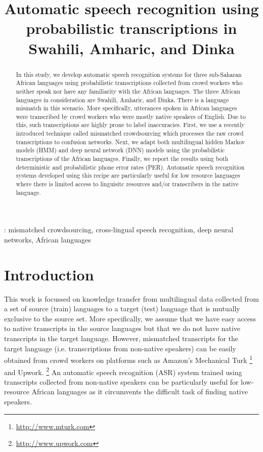 \documentclass[a4paper]{article}
\title{Automatic speech recognition using probabilistic transcriptions in Swahili, Amharic, and Dinka}
\newcommand{\myvspacesec}{\vspace{-2mm}}
\begin{document}
\maketitle
\begin{abstract}
In this study, we develop automatic speech recognition systems for three sub-Saharan African languages
using probabilistic transcriptions collected from crowd workers who neither speak nor have any familiarity
with the African languages. The three African languages in consideration are Swahili, Amharic, and Dinka. There is a language mismatch in this scenario. More specifically, utterances spoken in African languages were transcribed by crowd workers who were mostly native speakers of English. Due to this, such transcriptions are highly prone to label inaccuracies. First, we use a recently introduced technique called mismatched crowdsourcing which processes the raw crowd transcriptions to confusion networks. Next, we  adapt both multilingual hidden Markov models (HMM) and deep neural network (DNN) models using the probabilistic transcriptions of the African languages.  Finally, we report the results using both deterministic and probabilistic phone error rates (PER). Automatic speech recognition systems developed using this recipe are particularly useful for low resource languages where there is limited access to linguisitc resources and/or transcribers in the native language.
\end{abstract}
%
: mismatched crowdsourcing, cross-lingual speech recognition, deep neural networks,
African languages
\vspace{-3mm}
%
\myvspacesec
\section{Introduction}  \vspace{-2mm}
\label{sec:Introduction}
This work is focussed on knowledge transfer from multilingual data collected from a set of source (train) languages to a target (test) language that is mutually exclusive to the source set. More specifically, we assume that we have easy access to native transcripts in the source languages but that we do not have native transcripts in the target language. However, mismatched transcripts for the target language (i.e. transcriptions from non-native speakers) can be easily obtained from crowd workers on platforms such as Amazon's Mechanical Turk%
\footnote{\url{http://www.mturk.com}}
%
and Upwork.%
\footnote{\url{http://www.upwork.com}}
%
An automatic speech recognition (ASR) system trained using transcripts collected from non-native speakers can be particularly useful for low-resource African languages as it circumvents the difficult task of finding native speakers.
\end{document}
